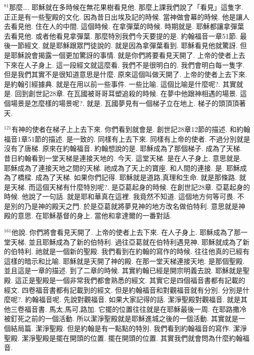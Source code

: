 \documentclass{book}
\begin{document}
$^{81}$那麼….
耶穌就在多時候在無花果樹看見他.
那麼上課我們說了「看見」這隻字.
正正是有一些聖殿的文化.
因為昔日出埃及記的時候.
當神做會幕的時候.
他是讓人去看見他.
住在人的中間.
這個時候.
在拿彈葉的時候.
時期就是.
耶穌都讓拿彈葉去看見他.
或者他看見拿彈葉.
那麼特別我們今天要提的是.
約翰福音一章51節.
最後一節經文.
就是耶穌跟眾門徒說的.
就是因為拿彈葉看到.
耶穌看見他就驚訝.
但是耶穌說會揭露一個更加驚訝的事情.
就是你們將要看見天開了.
上帝的使者上去下來在人子身上.
這一段經文就這麼看.
我們不是很明白的.
我們會明白每一隻字.
但是我們其實不是很知道意思是什麼.
原來這個叫做天開了.
上帝的使者上去下來.
是約翰引經據典.
就是在用以前一些事件.
一些比喻.
這個比喻是什麼呢?.
其實就是.
回到創世記28章.
在瓦國被哥哥耳塑追殺的時候.
在夢中他跟神相遇的場景.
這個場景是怎麼樣的場景呢?.
就是.
瓦國夢見有一個梯子立在地上.
梯子的頭頂頂著天.

$^{121}$有神的使者在梯子上上去下來.
你們看到就會是.
創世記28章12節的描述.
和約翰福音1章51節的描述.
是一致的.
同樣有上去下來.
同樣有上帝的使者.
不過分別就是沒有了唐梯.
原來在約翰福音.
約翰想說的是.
耶穌成為了那個梯子.
成為了天梯.
昔日約翰看到一堂天梯是連接天地的.
今天.
這堂天梯.
是在人子身上.
意思就是.
耶穌成為了連接天地之間的天梯.
祂成為了天上的寶座.
和人間的連接.
是.
耶穌成為了橋樑.
成為了天梯.
如果你們記得.
耶穌就是道路,真理和生命.
就是那條路.
就是天梯.
而這個天梯有什麼特別呢?.
是亞葛起身的時候.
在創世記28章.
亞葛起身的時候.
他說了一句話.
就是耶和華真在這裡.
我竟然不知道.
這個地方何等可畏.
不是別的乃是神的殿天之門.
於是亞葛就將夢見神的地方改名做伯特利.
意思就是神殿的意思.
在耶穌基督的身上.
當他和拿達爾的一番對話.

$^{161}$他說.
你們將會看見天開了.
上帝的使者上去下來.
在人子身上.
耶穌成為了那一堂天梯.
並且耶穌成為了新的伯特利.
過往亞葛就在伯特利遇見神.
耶穌就成為了新的伯特利.
祂就是一個新的聖殿.
我們看到在約翰的寫作的時候.
往往他真的已經有這樣的暗示和比喻.
耶穌就是天開了神的殿.
在那一堂天梯連接天地.
是那個聖殿.
並且這是一章的描述.
到了二章的時候.
其實約翰已經是開宗明義去說.
耶穌就是聖殿.
這正是聖殿是一個非常我們都會熟悉的經文.
其實它是四個福音書都有記載的經文.
四卷福音書都有記載到的經文.
但是約翰福音和對觀福音就有分別.
分別是什麼呢?.
約翰福音呢.
先說對觀福音.
如果大家記得的話.
潔淨聖殿對觀福音.
就是其他三卷福音書.
馬太,馬可,路加.
它擺的位置往往就是在耶穌最後一周.
在耶路撒冷被釘死之前的一個活動.
所以潔淨聖殿就是耶穌進城之後的一個活動.
其實就是一個結局篇.
潔淨聖殿.
但是約翰是有一點點的特別.
我們看到約翰福音的寫作.
潔淨聖殿.
潔淨聖殿是擺在開頭的位置.
擺在開頭的位置.
其實我們就會問為什麼約翰福音.
\end{document}
